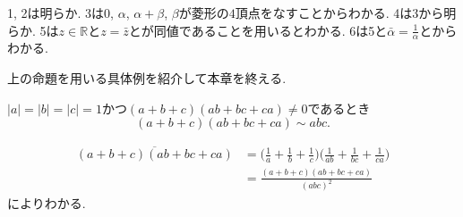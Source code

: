\begin{prf*}
1, 2は明らか.
3は$0$, $\alpha$, $\alpha+\beta$, $\beta$が菱形の$4$頂点をなすことからわかる.
4は3から明らか.
5は$z\in\mathbb{R}$と$z=\bar z$とが同値であることを用いるとわかる.
6は5と$\bar\alpha=\frac 1\alpha$とからわかる.
\end{prf*}
上の命題を用いる具体例を紹介して本章を終える.
\begin{eg}
$\lvert a\rvert=\lvert b\rvert=\lvert c\rvert=1$かつ$(a+b+c)(ab+bc+ca)\neq 0$であるとき
\[(a+b+c)(ab+bc+ca)\sim abc.\]
\begin{prf*}
\begin{align*}
\overline{(a+b+c)(ab+bc+ca)}
&=\biggl(\frac 1a+\frac 1b+\frac 1c\biggr)\biggl(\frac 1{ab}+\frac 1{bc}+\frac 1{ca}\biggr)\\
&=\frac{(a+b+c)(ab+bc+ca)}{(abc)^2}
\end{align*}
によりわかる.
\end{prf*}
\end{eg}